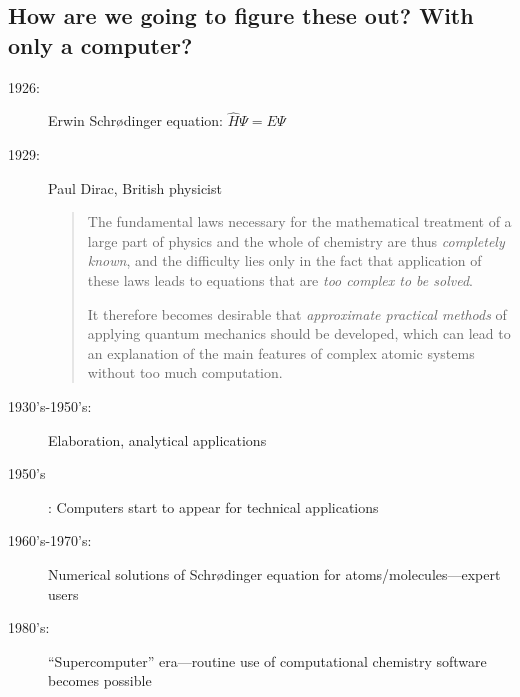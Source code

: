 \documentclass[12pt]{article}
\begin{document}
\subsection{How are we going to figure these out?  With only a computer?}
\begin{description}
\item[1926:] Erwin Schr{\o}dinger equation: $\hat{H}\Psi=E\Psi$
\item[1929:] Paul Dirac, British physicist

\begin{quote}
  The fundamental laws necessary for the mathematical treatment of a
  large part of physics and the whole of chemistry are thus {\em completely
  known}, and the difficulty lies only in the fact that application of
  these laws leads to equations that are {\em too complex to be solved}.  

  It therefore becomes desirable that {\em approximate practical methods} of
  applying quantum mechanics should be developed, which can lead to an
  explanation of the main features of complex atomic systems without
  too much computation.  
\end{quote}

\item[1930's-1950's:] Elaboration, analytical applications

\item[1950's]: Computers start to appear for technical applications

\item[1960's-1970's:] Numerical solutions of Schr{\o}dinger equation for
atoms/molecules---expert users

\item[1980's:] ``Supercomputer'' era---routine use of computational chemistry
software becomes possible


\end{description}
\end{document}
